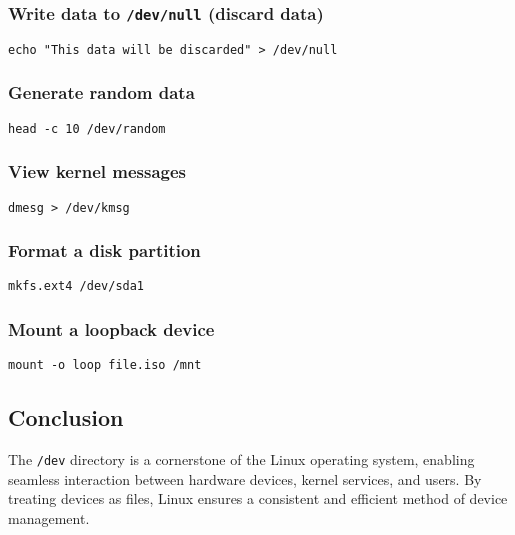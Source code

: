 \subsubsection*{Write data to \texttt{/dev/null} (discard data)}
\begin{lstlisting}
echo "This data will be discarded" > /dev/null
\end{lstlisting}

\subsubsection*{Generate random data}
\begin{lstlisting}
head -c 10 /dev/random
\end{lstlisting}

\subsubsection*{View kernel messages}
\begin{lstlisting}
dmesg > /dev/kmsg
\end{lstlisting}

\subsubsection*{Format a disk partition}
\begin{lstlisting}
mkfs.ext4 /dev/sda1
\end{lstlisting}

\subsubsection*{Mount a loopback device}
\begin{lstlisting}
mount -o loop file.iso /mnt
\end{lstlisting}

\subsection*{Conclusion}

The \texttt{/dev} directory is a cornerstone of the Linux operating system, enabling seamless interaction between hardware devices, kernel services, and users. By treating devices as files, Linux ensures a consistent and efficient method of device management.

